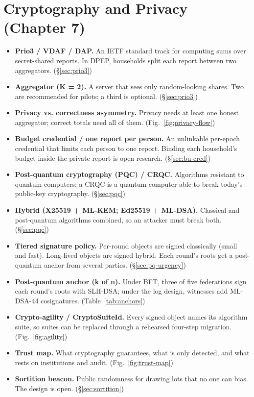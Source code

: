 \documentclass[10pt,twoside,openany]{book}
\theoremstyle{dpepstyle}
\begin{document}
\section*{Cryptography and Privacy (Chapter 7)}

\begin{itemize}[leftmargin=1.2em,itemsep=2pt,topsep=2pt]
\item \textbf{Prio3 / VDAF / DAP.} An IETF standard track for computing sums over secret-shared reports. In DPEP, households split each report between two aggregators. (\S\ref{sec:prio3})
\item \textbf{Aggregator (K = 2).} A server that sees only random-looking shares. Two are recommended for pilots; a third is optional. (\S\ref{sec:prio3})
\item \textbf{Privacy vs. correctness asymmetry.} Privacy needs at least one honest aggregator; correct totals need all of them. (Fig.~\ref{fig:privacy-flow})
\item \textbf{Budget credential / one report per person.} An unlinkable per-epoch credential that limits each person to one report. Binding each household's budget inside the private report is open research. (\S\ref{sec:bu-cred})
\item \textbf{Post-quantum cryptography (PQC) / CRQC.} Algorithms resistant to quantum computers; a CRQC is a quantum computer able to break today's public-key cryptography. (\S\ref{sec:pqc})
\item \textbf{Hybrid (X25519 + ML-KEM; Ed25519 + ML-DSA).} Classical and post-quantum algorithms combined, so an attacker must break both. (\S\ref{sec:pqc})
\item \textbf{Tiered signature policy.} Per-round objects are signed classically (small and fast). Long-lived objects are signed hybrid. Each round's roots get a post-quantum anchor from several parties. (\S\ref{sec:pq-urgency})
\item \textbf{Post-quantum anchor (k of n).} Under BFT, three of five federations sign each round's roots with SLH-DSA; under the log design, witnesses add ML-DSA-44 cosignatures. (Table~\ref{tab:anchors})
\item \textbf{Crypto-agility / CryptoSuiteId.} Every signed object names its algorithm suite, so suites can be replaced through a rehearsed four-step migration. (Fig.~\ref{fig:agility})
\item \textbf{Trust map.} What cryptography guarantees, what is only detected, and what rests on institutions and audit. (Fig.~\ref{fig:trust-map})
\item \textbf{Sortition beacon.} Public randomness for drawing lots that no one can bias. The design is open. (\S\ref{sec:sortition})
\end{itemize}
\end{document}
